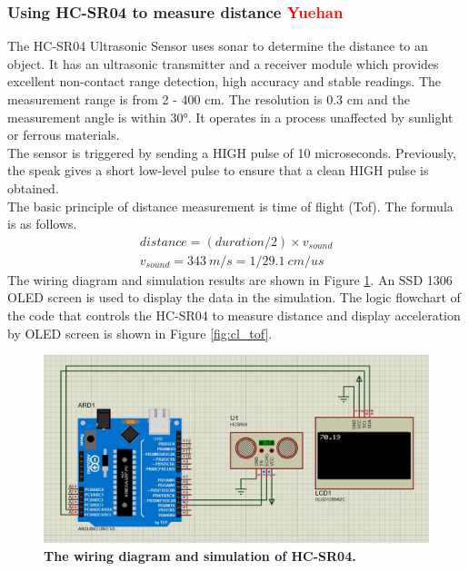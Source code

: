 \subsubsection{Using HC-SR04 to measure distance \textcolor{red}{Yuehan}}
The HC-SR04 Ultrasonic Sensor uses sonar to determine the distance to an object. It has an ultrasonic 
transmitter and a receiver module which provides excellent non-contact range detection, high accuracy and 
stable readings. The measurement range is from 2 - 400 cm. The resolution is 0.3 cm and the measurement angle 
is within 30°. It operates in a process unaffected by sunlight or ferrous materials. \\
The sensor is triggered by sending a HIGH pulse of 10 microseconds. Previously, the speak gives a short 
low-level pulse to ensure that a clean HIGH pulse is obtained. \\
The basic principle of distance measurement is time of flight (Tof). The formula is as follows.
\begin{align}
    distance = (duration/2) \times v_{sound} \\
    v_{sound} = 343\ m/s = 1/29.1\ cm/us \nonumber
\end{align}
\noindent The wiring diagram and simulation results are shown in Figure \ref{fig:tof}. An SSD 1306 OLED screen 
is used to display the data in the simulation. The logic flowchart of the code that controls the HC-SR04 to measure 
distance and display acceleration by OLED screen is shown in Figure \ref{fig:cl_tof}.
\begin{figure}[H] %
    \centering 
    \captionsetup{labelsep=colon}
    \includegraphics[width=0.8\linewidth]{Image/Design/tof_circuit.jpg}
    \caption[The wiring diagram and simulation of HC-SR04]
    {\centering \textbf{The wiring diagram and simulation of HC-SR04.}}
    \label{fig:tof}
\end{figure}
